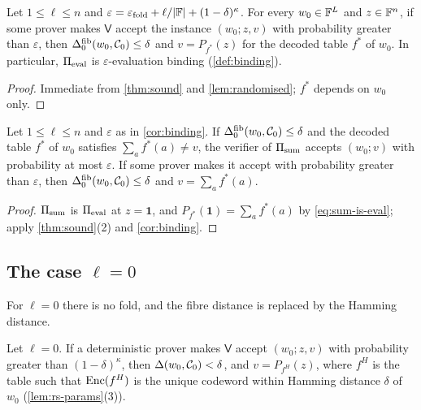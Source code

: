 \begin{corollary}\label{cor:binding}
Let $1 \le \ell \le n$ and $\varepsilon = \varepsilon_{\mathrm{fold}} + \ell/|\mathbb{F}| + (1-\delta)^{\kappa}$.
For every $w_0 \in \mathbb{F}^L$ and $z \in \mathbb{F}^n$, if some prover makes $\mathsf{V}$ accept the instance $(w_0; z,v)$ with probability greater than $\varepsilon$, then $\Delta^{\mathrm{fib}}_0(w_0,\mathcal{C}_0) \le \delta$ and $v = P_{f^*}(z)$ for the decoded table $f^*$ of $w_0$.
In particular, $\Pi_{\mathrm{eval}}$ is $\varepsilon$-evaluation binding (\cref{def:binding}).
\end{corollary}

\begin{proof}
Immediate from \cref{thm:sound} and \cref{lem:randomised}; $f^*$ depends on $w_0$ only.
\end{proof}

\begin{corollary}\label{cor:sum}
Let $1 \le \ell \le n$ and $\varepsilon$ as in \cref{cor:binding}.
If $\Delta^{\mathrm{fib}}_0(w_0, \mathcal{C}_0) \le \delta$ and the decoded table $f^*$ of $w_0$ satisfies $\sum_a f^*(a) \ne v$, the verifier of $\Pi_{\mathrm{sum}}$ accepts $(w_0; v)$ with probability at most $\varepsilon$.
If some prover makes it accept with probability greater than $\varepsilon$, then $\Delta^{\mathrm{fib}}_0(w_0,\mathcal{C}_0) \le \delta$ and $v = \sum_a f^*(a)$.
\end{corollary}

\begin{proof}
$\Pi_{\mathrm{sum}}$ is $\Pi_{\mathrm{eval}}$ at $z = \mathbf 1$, and $P_{f^*}(\mathbf 1) = \sum_a f^*(a)$ by \eqref{eq:sum-is-eval}; apply \cref{thm:sound}(2) and \cref{cor:binding}.
\end{proof}

\subsection{The case \texorpdfstring{$\ell = 0$}{l = 0}}\label{sec:sound:l0}

For $\ell = 0$ there is no fold, and the fibre distance is replaced by the Hamming distance.

\begin{proposition}[No folding]\label{prop:l0}
Let $\ell = 0$. If a deterministic prover makes $\mathsf{V}$ accept $(w_0; z,v)$ with probability greater than $(1-\delta)^{\kappa}$, then $\Delta(w_0, \mathcal{C}_0) < \delta$, and $v = P_{f^H}(z)$, where $f^H$ is the table such that $\mathrm{Enc}(f^H)$ is the unique codeword within Hamming distance $\delta$ of $w_0$ (\cref{lem:rs-params}(3)).
\end{proposition}

